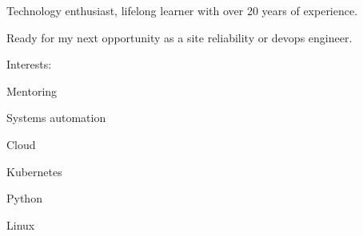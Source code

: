 

\begin{cvparagraph}

Technology enthusiast, lifelong learner with over 20 years of experience.

Ready for my next opportunity as a site reliability or devops engineer.

Interests:
\hfill \break

\begin{cvitems} %
    \item {Mentoring}
    \item {Systems automation}
    \item {Cloud}
    \item {Kubernetes}
    \item {Python}
    \item {Linux}
\end{cvitems}

\end{cvparagraph}
